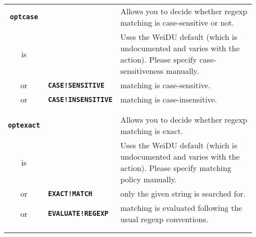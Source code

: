 \documentclass{article}
\def\DEFINE#1{{\tt \bf #1}\label{#1}\index{#1}}
\begin{document}
\begin{tabular}{cp{10in}|p{10in}}
\\

\DEFINE{optcase} && Allows you to decide whether regexp matching is case-sensitive
or not. \\
is  & & Uses the WeiDU default (which is undocumented and varies with the action).
      Please specify case-sensitiveness manually. \\
or & \DEFINE{CASE!SENSITIVE} & matching is case-sensitive. \\
or & \DEFINE{CASE!INSENSITIVE} & matching is case-insensitive. \\

\\

\\

\DEFINE{optexact} && Allows you to decide whether regexp matching is exact. \\
is  & & Uses the WeiDU default (which is undocumented and varies with the action).
      Please specify matching policy manually. \\
or & \DEFINE{EXACT!MATCH} & only the given string is searched for. \\
or & \DEFINE{EVALUATE!REGEXP} & matching is evaluated following the usual regexp
      conventions. \\

\\

\\


\end{tabular}
\end{document}
